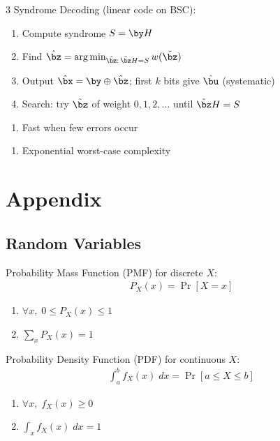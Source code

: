 \documentclass[12pt, a4paper]{article}
\begin{document}
\begin{multicols*}{3}
Syndrome Decoding (linear code on BSC):
\begin{enumerate}[\roman*.]
  \item Compute syndrome $S=\by H$
  \item Find $\hat\bz=\arg\min_{\tilde\bz:\,\tilde\bz H=S}w(\tilde\bz)$
  \item Output $\hat\bx=\by\oplus\hat\bz$; first $k$ bits give $\hat\bu$ (systematic)
  \item Search: try $\tilde\bz$ of weight $0,1,2,\dots$ until $\tilde\bz H=S$
\end{enumerate}
\begin{enumerate}[$+$]
  \item Fast when few errors occur
\end{enumerate}
\vspace{1pt}
\begin{enumerate}[$-$]
  \item Exponential worst-case complexity
\end{enumerate}
\colbreak
\section*{Appendix}
\subsection{Random Variables}
Probability Mass Function (PMF) for discrete $X$:
\begin{align*}
  P_X(x) = \Pr[X=x] 
\end{align*}
\begin{enumerate}[\roman*.]
  \item $\forall x,\;0 \leq P_X(x) \leq 1$
  \item $\sum_{x} P_X(x) = 1$
\end{enumerate}

Probability Density Function (PDF) for continuous $X$:
\begin{align*}
  \int^b_a f_X(x)\;dx = \Pr[a\leq X \leq b] 
\end{align*}
\begin{enumerate}[\roman*.]
  \item $\forall x,\;f_X(x) \geq 0$ 
  \item $\int_{x} f_X(x)\;dx = 1$
\end{enumerate}


\end{multicols*}
\end{document}
